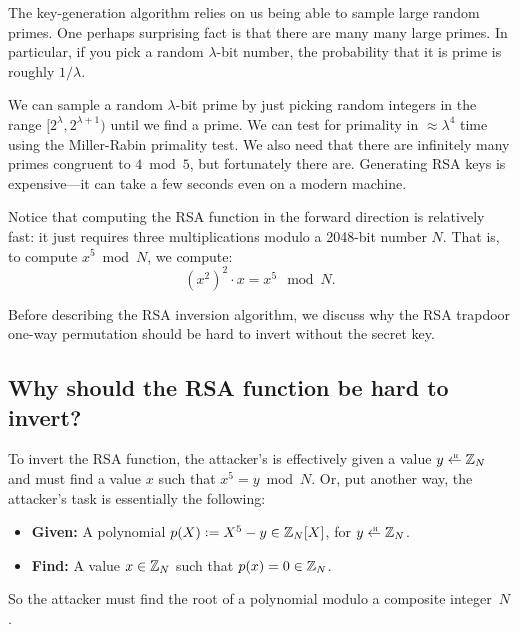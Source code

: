 \begin{remark}
The key-generation algorithm relies on us being able
to sample large random primes.
One perhaps surprising fact is that there are many many 
large primes.
In particular, if you pick a random $\lambda$-bit number,
the probability that it is prime is roughly $1/\lambda$.

We can sample a random $\lambda$-bit prime by just
picking random integers in the range $[2^\lambda, 2^{\lambda + 1})$
until we find a prime.
We can test for primality in $\approx \lambda^4$ time using
the Miller-Rabin primality test.
We also need that there are infinitely many primes congruent to
$4 \bmod 5$, but fortunately there are.
Generating RSA keys is expensive---it can take
a few seconds even on a modern machine.
\end{remark}

Notice that computing the RSA function in the forward direction is
relatively fast: it just requires three multiplications 
modulo a 2048-bit number $N$. That is, to compute $x^5 \bmod N$, we compute:
\[ (x^2)^2 \cdot x = x^5\mod N.\]

\medskip

Before describing the RSA inversion algorithm, we discuss 
why the RSA trapdoor one-way permutation should be hard
to invert without the secret key.

\subsection{Why should the RSA function be hard to invert?}
To invert the RSA function, the attacker's is effectively given
a value $y \getsr \Z_N$ and must find a value $x$ such that $x^5 = y \bmod N$.
Or, put another way, the attacker's task is essentially the following:
\begin{itemize}
  \item \textbf{Given:} A polynomial $p(X) \mathrel{\mathop:}= X^5 - y \in \mathbb{Z}_N[X]$,
                        for $y \getsr \Z_N$.
  \item \textbf{Find:}  A value $x \in \mathbb{Z}_N$ such that $p(x) = 0 \in \mathbb{Z}_N$.
\end{itemize}

So the attacker must find the root of a polynomial modulo a composite integer~$N$.

